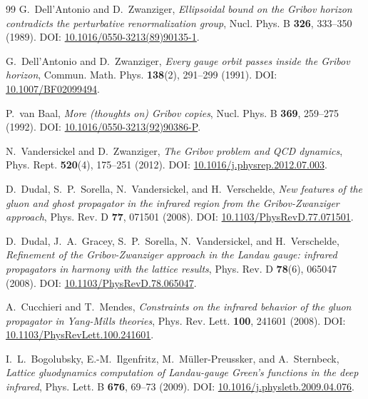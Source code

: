 \documentclass[11pt,a4paper]{amsart}
\theoremstyle{definition}
\begin{document}
\begin{thebibliography}{99}
G.~Dell'Antonio and D.~Zwanziger, \emph{Ellipsoidal bound on the Gribov horizon contradicts the perturbative renormalization group}, Nucl. Phys. B \textbf{326}, 333--350 (1989). DOI: \href{https://doi.org/10.1016/0550-3213(89)90135-1}{10.1016/0550-3213(89)90135-1}.

G.~Dell'Antonio and D.~Zwanziger, \emph{Every gauge orbit passes inside the Gribov horizon}, Commun. Math. Phys. \textbf{138}(2), 291--299 (1991). DOI: \href{https://doi.org/10.1007/BF02099494}{10.1007/BF02099494}.

P.~van Baal, \emph{More (thoughts on) Gribov copies}, Nucl. Phys. B \textbf{369}, 259--275 (1992). DOI: \href{https://doi.org/10.1016/0550-3213(92)90386-P}{10.1016/0550-3213(92)90386-P}.

N.~Vandersickel and D.~Zwanziger, \emph{The Gribov problem and QCD dynamics}, Phys. Rept. \textbf{520}(4), 175--251 (2012). DOI: \href{https://doi.org/10.1016/j.physrep.2012.07.003}{10.1016/j.physrep.2012.07.003}.

D.~Dudal, S.~P.~Sorella, N.~Vandersickel, and H.~Verschelde, \emph{New features of the gluon and ghost propagator in the infrared region from the Gribov-Zwanziger approach}, Phys. Rev. D \textbf{77}, 071501 (2008). DOI: \href{https://doi.org/10.1103/PhysRevD.77.071501}{10.1103/PhysRevD.77.071501}.

D.~Dudal, J.~A.~Gracey, S.~P.~Sorella, N.~Vandersickel, and H.~Verschelde, \emph{Refinement of the Gribov-Zwanziger approach in the Landau gauge: infrared propagators in harmony with the lattice results}, Phys. Rev. D \textbf{78}(6), 065047 (2008). DOI: \href{https://doi.org/10.1103/PhysRevD.78.065047}{10.1103/PhysRevD.78.065047}.

A.~Cucchieri and T.~Mendes, \emph{Constraints on the infrared behavior of the gluon propagator in Yang-Mills theories}, Phys. Rev. Lett. \textbf{100}, 241601 (2008). DOI: \href{https://doi.org/10.1103/PhysRevLett.100.241601}{10.1103/PhysRevLett.100.241601}.

I.~L.~Bogolubsky, E.-M.~Ilgenfritz, M.~M\"uller-Preussker, and A.~Sternbeck, \emph{Lattice gluodynamics computation of Landau-gauge Green's functions in the deep infrared}, Phys. Lett. B \textbf{676}, 69--73 (2009). DOI: \href{https://doi.org/10.1016/j.physletb.2009.04.076}{10.1016/j.physletb.2009.04.076}.


\end{thebibliography}
\end{document}
